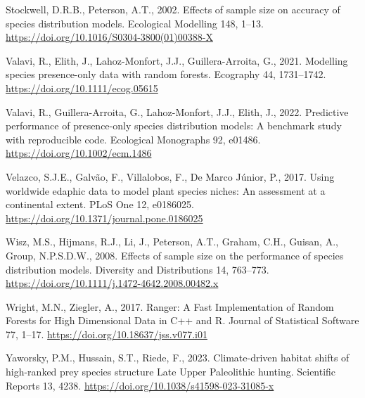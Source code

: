 \documentclass[
  number,
  review]{elsarticle}
\newlength{\cslhangindent}
\newenvironment{CSLReferences}[2] %
 {\begin{list}{}{%
  \setlength{\itemindent}{0pt}
  \setlength{\leftmargin}{0pt}
  \setlength{\parsep}{0pt}
  \ifodd #1
   \setlength{\leftmargin}{\cslhangindent}
   \setlength{\itemindent}{-1\cslhangindent}
  \fi
  \setlength{\itemsep}{#2\baselineskip}}}
 {\end{list}}
\begin{document}
\begin{CSLReferences}{1}{0}
Stockwell, D.R.B., Peterson, A.T., 2002. Effects of sample size on
accuracy of species distribution models. Ecological Modelling 148,
1--13. \url{https://doi.org/10.1016/S0304-3800(01)00388-X}

Valavi, R., Elith, J., Lahoz-Monfort, J.J., Guillera-Arroita, G., 2021.
Modelling species presence-only data with random forests. Ecography 44,
1731--1742. \url{https://doi.org/10.1111/ecog.05615}

Valavi, R., Guillera-Arroita, G., Lahoz-Monfort, J.J., Elith, J., 2022.
Predictive performance of presence-only species distribution models: A
benchmark study with reproducible code. Ecological Monographs 92,
e01486. \url{https://doi.org/10.1002/ecm.1486}

Velazco, S.J.E., Galvão, F., Villalobos, F., De Marco Júnior, P., 2017.
Using worldwide edaphic data to model plant species niches: {An}
assessment at a continental extent. PLoS One 12, e0186025.
\url{https://doi.org/10.1371/journal.pone.0186025}

Wisz, M.S., Hijmans, R.J., Li, J., Peterson, A.T., Graham, C.H., Guisan,
A., Group, N.P.S.D.W., 2008. Effects of sample size on the performance
of species distribution models. Diversity and Distributions 14,
763--773. \url{https://doi.org/10.1111/j.1472-4642.2008.00482.x}

Wright, M.N., Ziegler, A., 2017. Ranger: {A Fast Implementation} of
{Random Forests} for {High Dimensional Data} in {C}++ and {R}. Journal
of Statistical Software 77, 1--17.
\url{https://doi.org/10.18637/jss.v077.i01}

Yaworsky, P.M., Hussain, S.T., Riede, F., 2023. Climate-driven habitat
shifts of high-ranked prey species structure {Late Upper Paleolithic}
hunting. Scientific Reports 13, 4238.
\url{https://doi.org/10.1038/s41598-023-31085-x}

\end{CSLReferences}
\end{document}
